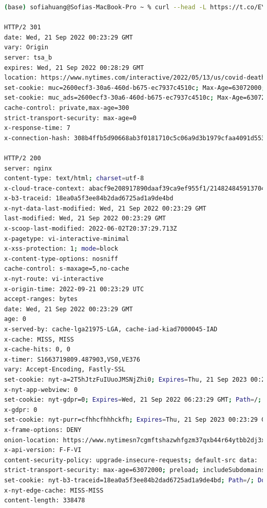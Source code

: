 \documentclass[12pt]{article}
\begin{document}
\begin{lstlisting}[language=bash, caption=HEAD HTTP request, label=lst:copy]
(base) sofiahuang@Sofias-MacBook-Pro ~ % curl --head -L https://t.co/EYgdZgrm2W
 
HTTP/2 301 
date: Wed, 21 Sep 2022 00:23:29 GMT
vary: Origin
server: tsa_b
expires: Wed, 21 Sep 2022 00:28:29 GMT
location: https://www.nytimes.com/interactive/2022/05/13/us/covid-deaths-us-one-million.html
set-cookie: muc=2600ecf3-30a6-460d-b675-ec7937c4510c; Max-Age=63072000; Expires=Fri, 20 Sep 2024 00:23:29 GMT; Domain=t.co; Secure; SameSite=None
set-cookie: muc_ads=2600ecf3-30a6-460d-b675-ec7937c4510c; Max-Age=63072000; Expires=Fri, 20 Sep 2024 00:23:29 GMT; Path=/; Domain=t.co; Secure; SameSite=None
cache-control: private,max-age=300
strict-transport-security: max-age=0
x-response-time: 7
x-connection-hash: 308b4ffb5d90668ab3f0181710c5c06a9d3b1979cfaa4091d553435a8a40e132

HTTP/2 200 
server: nginx
content-type: text/html; charset=utf-8
x-cloud-trace-context: abacf9e208917890daaf39ca9ef955f1/2148248459137043822
x-b3-traceid: 18ea0a5f3ee84b2dad6725ad1a9de4bd
x-nyt-data-last-modified: Wed, 21 Sep 2022 00:23:29 GMT
last-modified: Wed, 21 Sep 2022 00:23:29 GMT
x-scoop-last-modified: 2022-06-02T20:37:29.713Z
x-pagetype: vi-interactive-minimal
x-xss-protection: 1; mode=block
x-content-type-options: nosniff
cache-control: s-maxage=5,no-cache
x-nyt-route: vi-interactive
x-origin-time: 2022-09-21 00:23:29 UTC
accept-ranges: bytes
date: Wed, 21 Sep 2022 00:23:29 GMT
age: 0
x-served-by: cache-lga21975-LGA, cache-iad-kiad7000045-IAD
x-cache: MISS, MISS
x-cache-hits: 0, 0
x-timer: S1663719809.487903,VS0,VE376
vary: Accept-Encoding, Fastly-SSL
set-cookie: nyt-a=2T5hJtzFuIUuoJMSNjZhi0; Expires=Thu, 21 Sep 2023 00:23:29 GMT; Path=/; Domain=.nytimes.com; SameSite=none; Secure
x-nyt-app-webview: 0
set-cookie: nyt-gdpr=0; Expires=Wed, 21 Sep 2022 06:23:29 GMT; Path=/; Domain=.nytimes.com
x-gdpr: 0
set-cookie: nyt-purr=cfhhcfhhhckfh; Expires=Thu, 21 Sep 2023 00:23:29 GMT; Path=/; Domain=.nytimes.com; SameSite=Lax; Secure
x-frame-options: DENY
onion-location: https://www.nytimesn7cgmftshazwhfgzm37qxb44r64ytbb2dj3x62d2lljsciiyd.onion/interactive/2022/05/13/us/covid-deaths-us-one-million.html
x-api-version: F-F-VI
content-security-policy: upgrade-insecure-requests; default-src data: 'unsafe-inline' 'unsafe-eval' https:; script-src data: 'unsafe-inline' 'unsafe-eval' https: blob:; style-src data: 'unsafe-inline' https:; img-src data: https: blob: android-webview-video-poster:; font-src data: https:; connect-src https: wss: blob:; media-src data: https: blob:; object-src https:; child-src https: data: blob:; form-action https:; report-uri https://csp.nytimes.com/report;
strict-transport-security: max-age=63072000; preload; includeSubdomains
set-cookie: nyt-b3-traceid=18ea0a5f3ee84b2dad6725ad1a9de4bd; Path=/; Domain=.nytimes.com; SameSite=none; Secure
x-nyt-edge-cache: MISS-MISS
content-length: 338478

\end{lstlisting}
\end{document}
